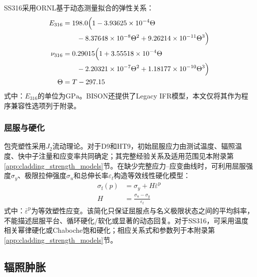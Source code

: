 SS316采用ORNL基于动态测量拟合的弹性关系\cite{Hammond1979ornl5442}：
\begin{subequations}\label{eq:ss316_elastic_properties}
	\begin{align}
		E_{316}
		&=198.0\Bigl(
		1-3.93625\times10^{-4}\Theta
		\notag\\
		&\qquad
		-8.37648\times10^{-8}\Theta^2
		+9.26214\times10^{-11}\Theta^3
		\Bigr)
		\label{eq:ss316_youngs_modulus}\\
		\nu_{316}
		&=0.29015\Bigl(
		1+3.55518\times10^{-4}\Theta
		\notag\\
		&\qquad
		-2.20321\times10^{-7}\Theta^2
		+1.18177\times10^{-10}\Theta^3
		\Bigr)
		\label{eq:ss316_poisson_ratio}\\
		\Theta&=T-297.15
		\label{eq:ss316_reduced_temperature}
	\end{align}
\end{subequations}
\noindent 式中：$E_{316}$的单位为$\mathrm{GPa}$。BISON还提供了Legacy IFR模型，本文仅将其作为程序兼容性选项列于附录。

\subsubsection{屈服与硬化}

包壳塑性采用$J_2$流动理论。对于D9和HT9，初始屈服应力由测试温度、辐照温度、快中子注量和应变率共同确定；其完整经验关系及适用范围见本附录第\ref{app:cladding_strength_models}节。在缺少完整应力--应变曲线时，可利用屈服强度$\sigma_y$、极限拉伸强度$\sigma_u$和总伸长率$\varepsilon_t$构造等效线性硬化模型：
\begin{subequations}\label{eq:clad_linear_hardening}
	\begin{align}
		\sigma_{\mathrm f}(p)&=\sigma_y+H\bar{\varepsilon}^{\mathrm{p}}
		\label{eq:clad_flow_stress}\\
		H&=\frac{\sigma_u-\sigma_y}{\varepsilon_t}
		\label{eq:clad_hardening_modulus}
	\end{align}
\end{subequations}
\noindent 式中：$\bar{\varepsilon}^{\mathrm{p}}$为等效塑性应变。该简化只保证屈服点与名义极限状态之间的平均斜率，不能描述屈服平台、循环硬化/软化或显著的动态回复。对于SS316，可采用温度相关幂律硬化或Chaboche饱和硬化；相应关系式和参数列于本附录第\ref{app:cladding_strength_models}节。

\subsection{辐照肿胀}
\label{sec:cladding_irradiation_swelling}


